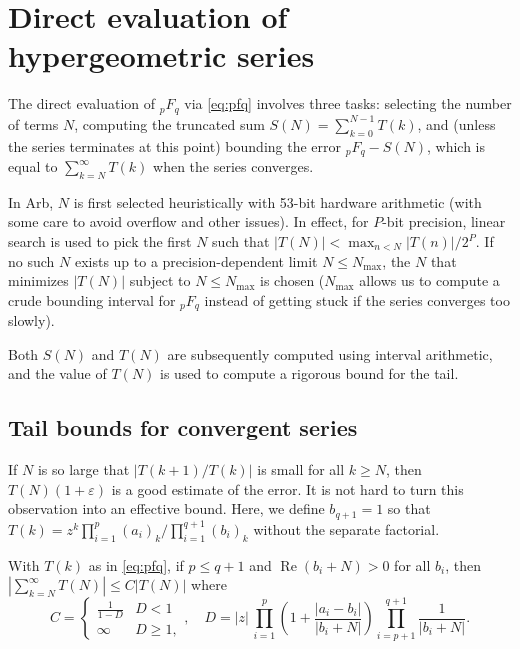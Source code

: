 \documentclass[review,nohypdvips]{siamart0216}
\begin{document}
\section{Direct evaluation of hypergeometric series}

\label{sect:hypdirsum}

The direct evaluation of ${}_pF_q$ via \cref{eq:pfq}
involves three tasks: selecting the number of terms $N$,
computing the truncated sum $S(N) = \sum_{k=0}^{N-1} T(k)$, and
(unless the series terminates at this point) bounding the error
${}_pF_q - S(N)$, which is equal to $\sum_{k=N}^{\infty} T(k)$ when
the series converges.

In Arb, $N$ is first selected heuristically with
53-bit hardware arithmetic (with some care to avoid overflow and other issues).
In effect, for $P$-bit precision,
linear search is used to pick the first $N$ such that
$|T(N)| < \max_{n < N} |T(n)| / 2^P$.
If no such $N$ exists up to a precision-dependent limit $N \le N_{\text{max}}$,
the $N$ that minimizes $|T(N)|$ subject to $N \le N_{\text{max}}$ is chosen
($N_{\text{max}}$
allows us to compute a crude bounding interval for
${}_pF_q$ instead of getting stuck if the series converges too slowly).

Both $S(N)$ and $T(N)$ are subsequently computed
using interval arithmetic, and the value of $T(N)$ is used to compute a
rigorous bound for the tail.

\subsection{Tail bounds for convergent series}

\label{sect:tails}

If $N$ is so large that $|T(k+1)/T(k)|$ is small for all $k \ge N$,
then $T(N) (1 + \varepsilon)$ is a good
estimate of the error.
It is not hard to turn this observation into an effective bound.
Here, we define $b_{q+1} = 1$ so that
$T(k) = z^k \prod_{i=1}^p (a_i)_k / \prod_{i=1}^{q+1} (b_i)_k$
without the separate factorial.

\begin{theorem}
\label{thm:pfqbound}
With $T(k)$ as in \cref{eq:pfq},
if $p \le q + 1$ and $\operatorname{Re}(b_i+N) > 0$ for all $b_i$,
then $\left|\sum_{k=N}^{\infty} T(N)\right| \le C |T(N)|$ where
\begin{equation*}
C = \begin{cases} \frac{1}{1-D} & D < 1 \\ \infty & D \ge 1, \end{cases}, \quad
D = |z| \, \prod_{i=1}^p \left(1 + \frac{|a_i-b_i|}{|b_i+N|}\right) \prod_{i=p+1}^{q+1} \frac{1}{|b_i + N|}.
\end{equation*}
\end{theorem}
\end{document}
